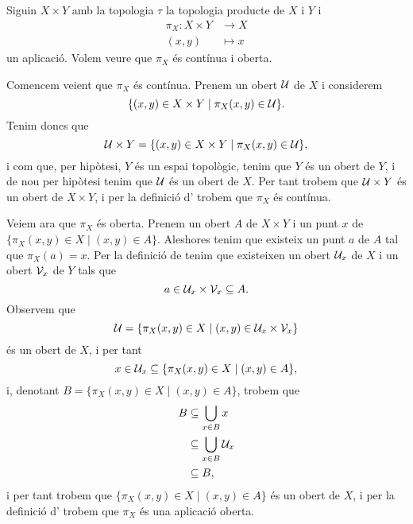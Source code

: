 \documentclass[../Apunts.tex]{subfiles}
\begin{document}
	\begin{example}[Projeccions]
		\label{ex:les projeccions en la topologia producte són contínues i obertes}
		Siguin \(X\times Y\) amb la topologia \(\tau\) la topologia producte de \(X\) i \(Y\) i
		\begin{align*}
			\pi_{X}\colon X\times Y&\longrightarrow X \\
			(x,y)&\longmapsto x
		\end{align*}
		un aplicació. Volem veure que \(\pi_{X}\) és contínua i oberta.
		\begin{solution}
			Comencem veient que \(\pi_{X}\) és contínua. Prenem un obert \(\mathcal{U}\) de \(X\) i considerem
			\[\{(x,y)\in X\times Y\mid \pi_{X}(x,y)\in\mathcal{U}\}.\]
			Tenim doncs que
			\[\mathcal{U}\times Y=\{(x,y)\in X\times Y\mid \pi_{X}(x,y)\in\mathcal{U}\},\]
			i com que, per hipòtesi, \(Y\) és un espai topològic, tenim que \(Y\) és un obert de \(Y\), i de nou per hipòtesi tenim que \(\mathcal{U}\) és un obert de \(X\). Per tant trobem que \(\mathcal{U}\times Y\) és un obert de \(X\times Y\), i per la definició d' trobem que \(\pi_{X}\) és contínua.
			
			Veiem ara que \(\pi_{X}\) és oberta. Prenem un obert \(A\) de \(X\times Y\) i un punt \(x\) de \(\{\pi_{X}(x,y)\in X\mid(x,y)\in A\}\). Aleshores tenim que existeix un punt \(a\) de \(A\) tal que \(\pi_{X}(a)=x\). Per la definició de  tenim que existeixen un obert \(\mathcal{U}_{x}\) de \(X\) i un obert \(\mathcal{V}_{x}\) de \(Y\) tals que
			\[a\in\mathcal{U}_{x}\times\mathcal{V}_{x}\subseteq A.\]
			Observem que
			\[\mathcal{U}=\{\pi_{X}(x,y)\in X\mid(x,y)\in\mathcal{U}_{x}\times\mathcal{V}_{x}\}\]
			és un obert de \(X\), i per tant
			\[x\in\mathcal{U}_{x}\subseteq\{\pi_{X}(x,y)\in X\mid(x,y)\in A\},\]
			i, denotant \(B=\{\pi_{X}(x,y)\in X\mid(x,y)\in A\}\), trobem que
			\begin{align*}
				B&\subseteq\bigcup_{x\in B}x \\
				&\subseteq\bigcup_{x\in B}\mathcal{U}_{x} \\ &\subseteq B,
			\end{align*}
			i per tant trobem que \(\{\pi_{X}(x,y)\in X\mid(x,y)\in A\}\) és un obert de \(X\), i per la definició d' trobem que \(\pi_{X}\) és una aplicació oberta. %
		\end{solution}
	\end{example}
\end{document}
